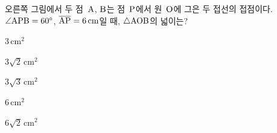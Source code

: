 \noindent\begin{minipage}[t]{0.58\linewidth}\vspace{0pt}\raggedright 오른쪽 그림에서 두 점~$\mathrm{A}$, $\mathrm{B}$는 점~$\mathrm{P}$에서 원~$\mathrm{O}$에 그은 두 접선의 접점이다. $\angle\mathrm{APB}=60^\circ$, $\overline{\mathrm{AP}}=6\,\mathrm{cm}$일 때, $\triangle\mathrm{AOB}$의 넓이는?\end{minipage}\hfill\begin{minipage}[t]{0.4\linewidth}\vspace{0pt}\centering \resizebox{\ifdim\width>\linewidth\linewidth\else\width\fi}{!}{}\end{minipage}\par
\begin{choices32}{\rule[-3ex]{0pt}{8ex}$3\,\mathrm{cm}^2$}{\rule[-3ex]{0pt}{8ex}$3\sqrt{2}\,\mathrm{cm}^2$}{\rule[-3ex]{0pt}{8ex}$3\sqrt{3}\,\mathrm{cm}^2$}{\rule[-3ex]{0pt}{8ex}$6\,\mathrm{cm}^2$}{\rule[-3ex]{0pt}{8ex}$6\sqrt{2}\,\mathrm{cm}^2$}\end{choices32}
